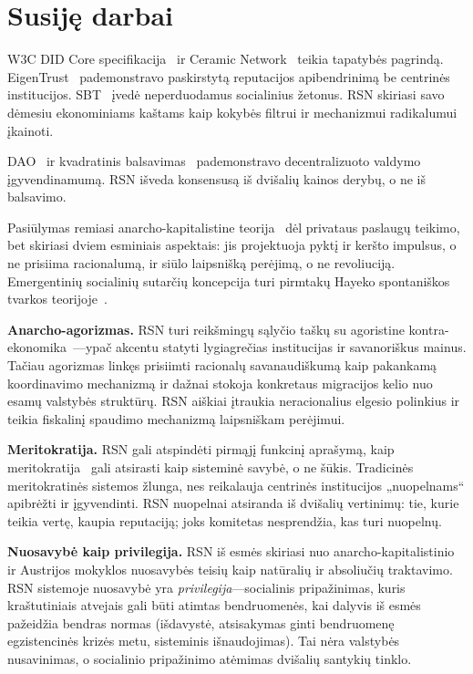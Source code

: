 \documentclass[11pt,a4paper,twocolumn]{article}
\begin{document}
\section{Susiję darbai}

W3C DID Core specifikacija~\cite{did2022} ir Ceramic Network~\cite{ceramic2023} teikia tapatybės pagrindą. EigenTrust~\cite{kamvar2003} pademonstravo paskirstytą reputacijos apibendrinimą be centrinės institucijos. SBT~\cite{weyl2022} įvedė neperduodamus socialinius žetonus. RSN skiriasi savo dėmesiu ekonominiams kaštams kaip kokybės filtrui ir mechanizmui radikalumui įkainoti.

DAO~\cite{buterin2014} ir kvadratinis balsavimas~\cite{buterin2019} pademonstravo decentralizuoto valdymo įgyvendinamumą. RSN išveda konsensusą iš dvišalių kainos derybų, o ne iš balsavimo.

Pasiūlymas remiasi anarcho-kapitalistine teorija~\cite{rothbard1973,hoppe2001} dėl privataus paslaugų teikimo, bet skiriasi dviem esminiais aspektais: jis projektuoja pyktį ir keršto impulsus, o ne prisiima racionalumą, ir siūlo laipsnišką perėjimą, o ne revoliuciją. Emergentinių socialinių sutarčių koncepcija turi pirmtakų Hayeko spontaniškos tvarkos teorijoje~\cite{hayek1973}.

\textbf{Anarcho-agorizmas.} RSN turi reikšmingų sąlyčio taškų su agoristine kontra-ekonomika~\cite{konkin2006}---ypač akcentu statyti lygiagrečias institucijas ir savanoriškus mainus. Tačiau agorizmas linkęs prisiimti racionalų savanaudiškumą kaip pakankamą koordinavimo mechanizmą ir dažnai stokoja konkretaus migracijos kelio nuo esamų valstybės struktūrų. RSN aiškiai įtraukia neracionalius elgesio polinkius ir teikia fiskalinį spaudimo mechanizmą laipsniškam perėjimui.

\textbf{Meritokratija.} RSN gali atspindėti pirmąjį funkcinį aprašymą, kaip meritokratija~\cite{young1958} gali atsirasti kaip sisteminė savybė, o ne šūkis. Tradicinės meritokratinės sistemos žlunga, nes reikalauja centrinės institucijos „nuopelnams“ apibrėžti ir įgyvendinti. RSN nuopelnai atsiranda iš dvišalių vertinimų: tie, kurie teikia vertę, kaupia reputaciją; joks komitetas nesprendžia, kas turi nuopelnų.

\textbf{Nuosavybė kaip privilegija.} RSN iš esmės skiriasi nuo anarcho-kapitalistinio ir Austrijos mokyklos nuosavybės teisių kaip natūralių ir absoliučių traktavimo. RSN sistemoje nuosavybė yra \emph{privilegija}---socialinis pripažinimas, kuris kraštutiniais atvejais gali būti atimtas bendruomenės, kai dalyvis iš esmės pažeidžia bendras normas (išdavystė, atsisakymas ginti bendruomenę egzistencinės krizės metu, sisteminis išnaudojimas). Tai nėra valstybės nusavinimas, o socialinio pripažinimo atėmimas dvišalių santykių tinklo.
\end{document}
